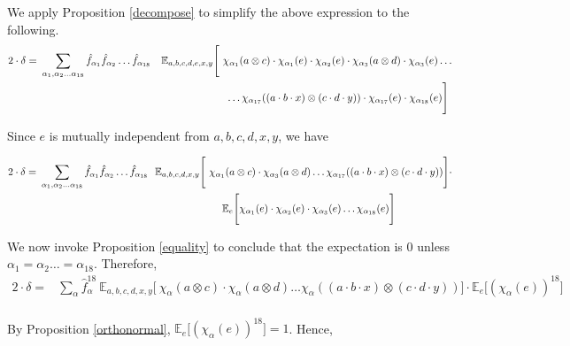 \documentclass[11pt]{article}
\begin{document}
\noindent We apply Proposition \ref{decompose} to simplify the above
expression to the following.
\begin{align*}
 2 \cdot \delta = & \  \sum_{\alpha_1, \alpha_2 \ldots \alpha_{18}} \hat{f}_{\alpha_1}\hat{f}_{\alpha_2} \ldots \hat{f}_{\alpha_{18}}\ \ \ \mathbb{E}_{a,b,c,d,e,x,y}\Bigg[\ \chi_{\alpha_1}(a \otimes c) \cdot \chi_{\alpha_1}(e) \cdot \chi_{\alpha_2}(e) \cdot \chi_{\alpha_3}(a \otimes d) \cdot \chi_{\alpha_3}(e)  \ldots \\ &  \hspace*{2.5in} \ldots  \chi_{\alpha_{17}}((a \cdot b \cdot x) \otimes (c \cdot d \cdot y)) \cdot \chi_{\alpha_{17}}(e) \cdot \chi_{\alpha_{18}}(e) \Bigg]
\end{align*}

\noindent Since $e$ is mutually independent from $a,b,c,d,x,y$, we have

\begin{align*}
2 \cdot \delta = & \  \sum_{\alpha_1, \alpha_2 \ldots \alpha_{18}} \hat{f}_{\alpha_1}\hat{f}_{\alpha_2} \ldots \hat{f}_{\alpha_{18}}\ \ \mathbb{E}_{a,b,c,d,x,y}\Bigg[\ \chi_{\alpha_1}(a \otimes c) \cdot  \chi_{\alpha_3}(a \otimes d) \ldots  \chi_{\alpha_{17}}((a \cdot b \cdot x) \otimes (c \cdot d \cdot y)) \Bigg] \cdot \\ & \hspace{2.5in}  \mathbb{E}_e \Bigg[ \chi_{\alpha_1}(e) \cdot \chi_{\alpha_2}(e) \cdot \chi_{\alpha_3}(e) \ldots \chi_{\alpha_{18}}(e) \Bigg]
\end{align*}

\noindent We now invoke Proposition \ref{equality} to conclude that
the expectation is $0$ unless $\alpha_1 = \alpha_2 \ldots =
\alpha_{18}$. Therefore,
\begin{align*}
  2 \cdot \delta = & \sum_\alpha \hat{f}^{18}_{\alpha}\  \mathbb{E}_{a,b,c,d,x,y}\Bigg[\ \chi_{\alpha}(a \otimes c) \cdot  \chi_{\alpha}(a \otimes d) \ldots  \chi_{\alpha}((a \cdot b \cdot x) \otimes (c \cdot d \cdot y)) \Bigg] \cdot \mathbb{E}_e \Bigg[ \left(\chi_{\alpha}\left(e\right)\right)^{18} \Bigg]\\
\end{align*}

\noindent By Proposition \ref{orthonormal}, $\mathbb{E}_e \Bigg[
\left(\chi_{\alpha}\left(e\right)\right)^{18} \Bigg] = 1$. Hence,
\end{document}
